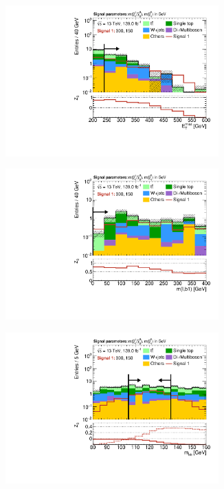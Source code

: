 \begin{figure}
\begin{subfigure}[b]{0.5\linewidth}
	\end{subfigure}\hfill
	\begin{subfigure}[b]{0.5\linewidth}
		\centering\includegraphics[width=0.9\textwidth]{N-1_cut_scan/n1_300_150/met}
	\end{subfigure}\hfill
	\begin{subfigure}[b]{0.5\linewidth}
		\centering\includegraphics[width=0.9\textwidth]{N-1_cut_scan/n1_300_150/mlb1}
	\end{subfigure}\hfill
	\begin{subfigure}[b]{0.5\linewidth}
		\centering\includegraphics[width=0.9\textwidth]{N-1_cut_scan/n1_300_150/mbb_both}

\end{subfigure}
\end{figure}
